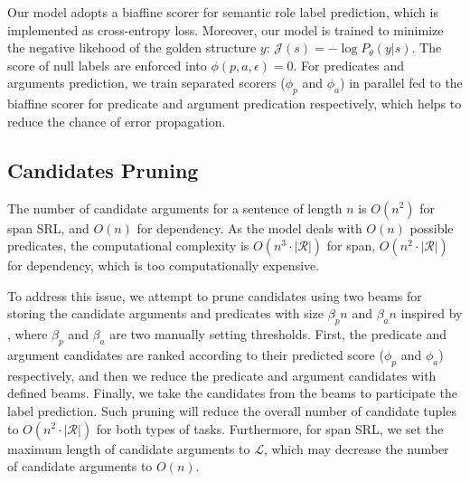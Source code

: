 \documentclass[letterpaper]{article} \usepackage{aaai19}  \usepackage{times}  \usepackage{helvet}  \usepackage{courier}  \usepackage{url}  \usepackage{graphicx}  \frenchspacing  \setlength{\pdfpagewidth}{8.5in}  \setlength{\pdfpageheight}{11in}
\begin{document}
Our model adopts a biaffine scorer for semantic role label prediction, which is implemented as cross-entropy loss. Moreover, our model is trained to minimize the negative likehood of the golden structure $y$: $\mathcal{J}(s) = -\log \textit{P}_\theta(y|s)$.
The score of null labels are enforced into $\phi(p, a, \epsilon) = 0$. For predicates and arguments prediction, we train separated scorers ($\phi_p$ and $\phi_a$) in parallel fed to the biaffine scorer for predicate and argument predication respectively, which helps to reduce the chance of error propagation. 



\subsection{Candidates Pruning}

The number of candidate arguments for a sentence of length $n$ is $\textit{O}(n^2)$ for span SRL, and $\textit{O}(n)$ for dependency. As the model deals with $\textit{O}(n)$ possible predicates, the computational complexity is $\textit{O}(n^3 \cdot |\mathcal{R}|)$ for span, $\textit{O}(n^2 \cdot |\mathcal{R}|)$  for dependency, which is too computationally expensive.

To address this issue, we attempt to prune candidates using two beams for storing the candidate arguments and predicates with size $\beta_pn$ and $\beta_an$ inspired by \citeauthor{he2018jointly} , where $\beta_p$ and $\beta_a$ are two manually setting thresholds. First, the predicate and argument candidates are ranked according to their predicted score ($\phi_p$ and $\phi_a$) respectively, and then we reduce the predicate and argument candidates with defined beams. Finally, we take the candidates from the beams to participate the label prediction. Such pruning will reduce the overall number of candidate tuples to  $\textit{O}(n^2 \cdot |\mathcal{R}|)$ for both types of tasks. Furthermore, for span SRL, we set the maximum length of candidate arguments to $\mathcal{L}$, which may decrease the number of candidate arguments to $\textit{O}(n)$.
\end{document}
